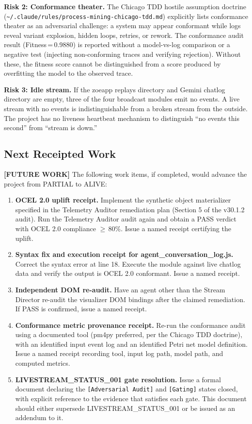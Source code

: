 \textbf{Risk 2: Conformance theater.}
The Chicago TDD hostile assumption doctrine (\texttt{\textasciitilde/.claude/rules/process-mining-chicago-tdd.md})
explicitly lists conformance theater as an adversarial challenge: a system may
appear conformant while logs reveal variant explosion, hidden loops, retries, or
rework. The conformance audit result (Fitness\,=\,0.9880) is reported without a
model-vs-log comparison or a negative test (injecting non-conforming traces and
verifying rejection). Without these, the fitness score cannot be distinguished from
a score produced by overfitting the model to the observed trace.

\textbf{Risk 3: Idle stream.}
If the zoeapp replays directory and Gemini chatlog directory are empty, three of
the four broadcast modules emit no events. A live stream with no events is
indistinguishable from a broken stream from the outside. The project has no
liveness heartbeat mechanism to distinguish ``no events this second'' from
``stream is down.''

\subsection{Next Receipted Work}
\label{sec:livestream-open-next}

\textbf{[FUTURE WORK]} The following work items, if completed, would advance the
project from PARTIAL to ALIVE:

\begin{enumerate}
  \item \textbf{OCEL 2.0 uplift receipt.} Implement the synthetic object
    materializer specified in the Telemetry Auditor remediation plan (Section 5
    of the v30.1.2 audit). Run the Telemetry Auditor audit again and obtain a PASS
    verdict with OCEL 2.0 compliance $\geq$\,80\%. Issue a named receipt certifying
    the uplift.
  \item \textbf{Syntax fix and execution receipt for agent\_conversation\_log.js.}
    Correct the syntax error at line 18. Execute the module against live chatlog
    data and verify the output is OCEL 2.0 conformant. Issue a named receipt.
  \item \textbf{Independent DOM re-audit.} Have an agent other than the Stream
    Director re-audit the visualizer DOM bindings after the claimed remediation.
    If PASS is confirmed, issue a named receipt.
  \item \textbf{Conformance metric provenance receipt.} Re-run the conformance audit
    using a documented tool (pm4py preferred, per the Chicago TDD doctrine), with
    an identified input event log and an identified Petri net model definition.
    Issue a named receipt recording tool, input log path, model path, and computed
    metrics.
  \item \textbf{LIVESTREAM\_STATUS\_001 gate resolution.} Issue a formal document
    declaring the \texttt{[Adversarial Audit]} and \texttt{[Gating]} states closed,
    with explicit reference to the evidence that satisfies each gate. This document
    should either supersede LIVESTREAM\_STATUS\_001 or be issued as an addendum to it.
\end{enumerate}
